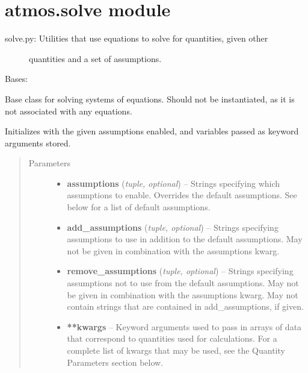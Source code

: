 \documentclass[letterpaper,10pt,english]{sphinxmanual}
\begin{document}
\section{atmos.solve module}
\label{atmos:module-atmos.solve}\label{atmos:atmos-solve-module}\begin{description}
\item[{solve.py: Utilities that use equations to solve for quantities, given other}] \leavevmode
quantities and a set of assumptions.

\end{description}

\begin{fulllineitems}
\label{atmos:atmos.solve.BaseSolver}
Bases: 

Base class for solving systems of equations. Should not be instantiated,
as it is not associated with any equations.

Initializes with the given assumptions enabled, and variables passed as
keyword arguments stored.
\begin{quote}\begin{description}
\item[{Parameters}] \leavevmode\begin{itemize}
\item {} 
\textbf{assumptions} (\emph{tuple, optional}) -- Strings specifying which assumptions to enable. Overrides the default
assumptions. See below for a list of default assumptions.

\item {} 
\textbf{add\_assumptions} (\emph{tuple, optional}) -- Strings specifying assumptions to use in addition to the default
assumptions. May not be given in combination with the assumptions kwarg.

\item {} 
\textbf{remove\_assumptions} (\emph{tuple, optional}) -- Strings specifying assumptions not to use from the default assumptions.
May not be given in combination with the assumptions kwarg. May not
contain strings that are contained in add\_assumptions, if given.

\item {} 
\textbf{**kwargs} -- 
Keyword arguments used to pass in arrays of data that correspond to
quantities used for calculations. For a complete list of kwargs that
may be used, see the Quantity Parameters section below.



\end{itemize}
\end{description}
\end{quote}
\end{fulllineitems}
\end{document}
